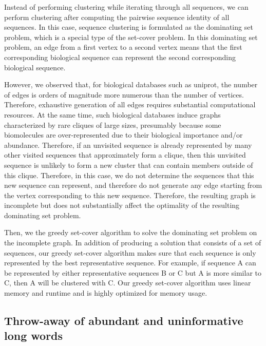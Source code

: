 \documentclass[11pt,letterpaper]{article}
\begin{document}
Instead of performing clustering while iterating through all sequences, we can perform clustering after computing the pairwise sequence identity of all sequences. 
In this case, sequence clustering is formulated as the dominating set problem, which is a special type of the set-cover problem. 
In this dominating set problem, an edge from a first vertex to a second vertex means that the first corresponding biological sequence can represent the second corresponding biological sequence. 

However, we observed that, for biological databases such as uniprot, the number of edges is orders of magnitude more numerous than the number of vertices. Therefore, exhaustive generation of all edges requires substantial computational resources.
At the same time, such biological databases induce graphs characterized by rare cliques of large sizes, presumably because some biomolecules are over-represented due to their biological importance and/or abundance.
Therefore, if an unvisited sequence is already represented by many other visited sequences that approximately form a clique, then this unvisited sequence is unlikely to form a new cluster that can contain members outside of this clique. 
Therefore, in this case, we do not determine the sequences that this new sequence can represent, and therefore do not generate any edge starting from the vertex corresponding to this new sequence. 
Therefore, the resulting graph is incomplete but does not substantially affect the optimality of the resulting dominating set problem.

Then, we the greedy set-cover algorithm to solve the dominating set problem on the incomplete graph.
In addition of producing a solution that consists of a set of sequences, 
our greedy set-cover algorithm makes sure that each sequence is only represented by the best representative sequence.
For example, if sequence A can be represented by either representative sequences B or C but A is more similar to C,
then A will be clustered with C.
Our greedy set-cover algorithm uses linear memory and runtime and is highly optimized for memory usage.

\subsection{Throw-away of abundant and uninformative long words}
\end{document}
